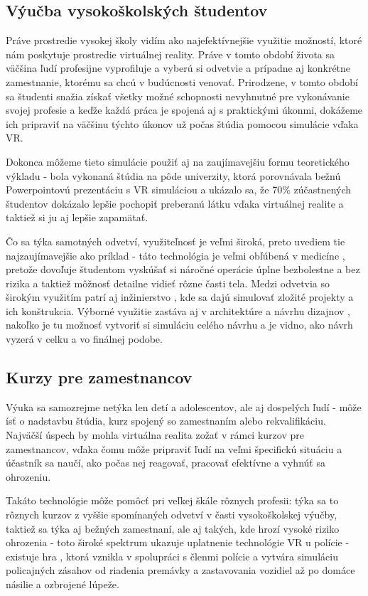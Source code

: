 \documentclass[10pt,twoside,slovak,a4paper]{article}
\begin{document}
\subsection{Výučba vysokoškolských študentov} \label{studenti}
Práve prostredie vysokej školy vidím ako najefektívnejšie využitie možností, ktoré nám poskytuje prostredie virtuálnej reality. Práve v tomto období života sa väčšina ľudí profesijne vyprofiluje a vyberú si odvetvie a prípadne aj konkrétne zamestnanie, ktorému sa chcú v budúcnosti venovať. Prirodzene, v tomto období sa študenti snažia získať všetky možné schopnosti nevyhnutné pre vykonávanie svojej profesie a keďže každá práca je spojená aj s praktickými úkonmi, dokážeme ich pripraviť na väčšinu týchto úkonov už počas štúdia pomocou simulácie vďaka VR. 

Dokonca môžeme tieto simulácie použiť aj na zaujímavejšiu formu teoretického výkladu - bola vykonaná štúdia na pôde univerzity, \cite{studium} ktorá porovnávala bežnú Powerpointovú prezentáciu s VR simuláciou a ukázalo sa, že 70\%  zúčastnených študentov dokázalo lepšie pochopiť preberanú látku vďaka virtuálnej realite a taktiež si ju aj lepšie zapamätať.

Čo sa týka samotných odvetví, využiteľnosť je veľmi široká, preto uvediem tie najzaujímavejšie ako príklad - táto technológia je veľmi obľúbená v medicíne \cite{lekarstvo}, pretože dovoľuje študentom vyskúšať si náročné operácie úplne bezbolestne a bez rizika a taktiež môžnosť detailne vidieť rôzne časti tela. Medzi odvetvia so širokým využitím patrí aj inžinierstvo \cite{inzinierstvo}, kde sa dajú simulovať zložité projekty a ich konštrukcia. Výborné využitie zastáva aj v architektúre a návrhu dizajnov \cite{design}, nakoľko je tu možnosť vytvoriť si simuláciu celého návrhu a je vidno, ako návrh vyzerá v celku a vo finálnej podobe.

\subsection{Kurzy pre zamestnancov} \label{zamestnanci}
Výuka sa samozrejme netýka len detí a adolescentov, ale aj dospelých ľudí - môže ísť o nadstavbu štúdia, kurz spojený so zamestnaním alebo rekvalifikáciu. Najväčší úspech by mohla virtuálna realita zožať v rámci kurzov pre zamestnancov, vďaka čomu môže pripraviť ľudí na veľmi špecifickú situáciu a účastník sa naučí, ako počas nej reagovať, pracovať efektívne a vyhnúť sa ohrozeniu. 

Takáto technológie môže pomôcť pri veľkej škále rôznych profesii: týka sa to rôznych kurzov z vyššie spomínaných odvetví v časti vysokoškolskej výučby, taktiež sa týka aj bežných zamestnaní, ale aj takých, kde hrozí vysoké riziko ohrozenia - toto široké spektrum ukazuje uplatnenie technológie VR u polície - existuje hra \cite{policia}, ktorá vznikla v spolupráci s členmi polície a vytvára simuláciu policajných zásahov od riadenia premávky a zastavovania vozidiel až po domáce násilie a ozbrojené lúpeže.
\end{document}
